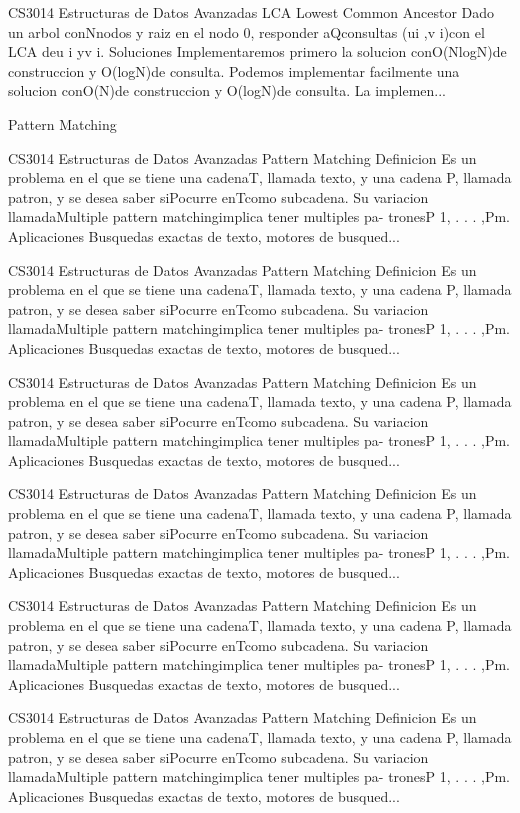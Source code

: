 \begin{description}[leftmargin=!,labelwidth=4.2em,style=nextline]
\item[Pag. 17] CS3014 Estructuras de Datos Avanzadas LCA Lowest Common Ancestor Dado un arbol conNnodos y raiz en el nodo 0, responder aQconsultas (ui ,v i)con el LCA deu i yv i. Soluciones Implementaremos primero la solucion conO(NlogN)de construccion y O(logN)de consulta. Podemos implementar facilmente una solucion conO(N)de construccion y O(logN)de consulta. La implemen...
\item[Pag. 18] Pattern Matching
\item[Pag. 19] CS3014 Estructuras de Datos Avanzadas Pattern Matching Definicion Es un problema en el que se tiene una cadenaT, llamada texto, y una cadena P, llamada patron, y se desea saber siPocurre enTcomo subcadena. Su variacion llamadaMultiple pattern matchingimplica tener multiples pa- tronesP 1, . . . ,Pm. Aplicaciones Busquedas exactas de texto, motores de busqued...
\item[Pag. 20] CS3014 Estructuras de Datos Avanzadas Pattern Matching Definicion Es un problema en el que se tiene una cadenaT, llamada texto, y una cadena P, llamada patron, y se desea saber siPocurre enTcomo subcadena. Su variacion llamadaMultiple pattern matchingimplica tener multiples pa- tronesP 1, . . . ,Pm. Aplicaciones Busquedas exactas de texto, motores de busqued...
\item[Pag. 21] CS3014 Estructuras de Datos Avanzadas Pattern Matching Definicion Es un problema en el que se tiene una cadenaT, llamada texto, y una cadena P, llamada patron, y se desea saber siPocurre enTcomo subcadena. Su variacion llamadaMultiple pattern matchingimplica tener multiples pa- tronesP 1, . . . ,Pm. Aplicaciones Busquedas exactas de texto, motores de busqued...
\item[Pag. 22] CS3014 Estructuras de Datos Avanzadas Pattern Matching Definicion Es un problema en el que se tiene una cadenaT, llamada texto, y una cadena P, llamada patron, y se desea saber siPocurre enTcomo subcadena. Su variacion llamadaMultiple pattern matchingimplica tener multiples pa- tronesP 1, . . . ,Pm. Aplicaciones Busquedas exactas de texto, motores de busqued...
\item[Pag. 23] CS3014 Estructuras de Datos Avanzadas Pattern Matching Definicion Es un problema en el que se tiene una cadenaT, llamada texto, y una cadena P, llamada patron, y se desea saber siPocurre enTcomo subcadena. Su variacion llamadaMultiple pattern matchingimplica tener multiples pa- tronesP 1, . . . ,Pm. Aplicaciones Busquedas exactas de texto, motores de busqued...
\item[Pag. 24] CS3014 Estructuras de Datos Avanzadas Pattern Matching Definicion Es un problema en el que se tiene una cadenaT, llamada texto, y una cadena P, llamada patron, y se desea saber siPocurre enTcomo subcadena. Su variacion llamadaMultiple pattern matchingimplica tener multiples pa- tronesP 1, . . . ,Pm. Aplicaciones Busquedas exactas de texto, motores de busqued...

\end{description}
